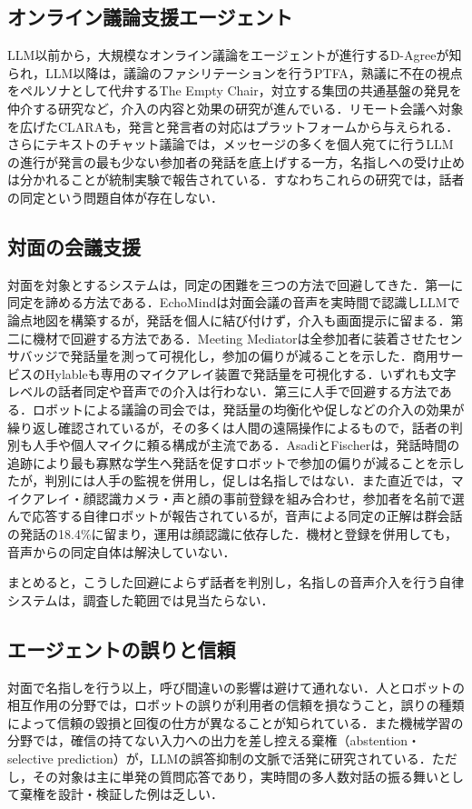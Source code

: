 \documentclass[a4paper]{ltjsarticle}
\begin{document}
\subsection{オンライン議論支援エージェント}
LLM以前から，大規模なオンライン議論をエージェントが進行するD-Agree\cite{ito}が知られ，LLM以降は，議論のファシリテーションを行うPTFA\cite{gu}，熟議に不在の視点をペルソナとして代弁するThe Empty Chair\cite{fulay}，対立する集団の共通基盤の発見を仲介する研究\cite{tessler}など，介入の内容と効果の研究が進んでいる．リモート会議へ対象を広げたCLARA\cite{gunasekaran}も，発言と発言者の対応はプラットフォームから与えられる．さらにテキストのチャット議論では，メッセージの多くを個人宛てに行うLLMの進行が発言の最も少ない参加者の発話を底上げする一方，名指しへの受け止めは分かれることが統制実験で報告されている\cite{alsobay}．すなわちこれらの研究では，話者の同定という問題自体が存在しない．

\subsection{対面の会議支援}
対面を対象とするシステムは，同定の困難を三つの方法で回避してきた．第一に同定を諦める方法である．EchoMind\cite{chen}は対面会議の音声を実時間で認識しLLMで論点地図を構築するが，発話を個人に結び付けず，介入も画面提示に留まる．第二に機材で回避する方法である．Meeting Mediator\cite{kim}は全参加者に装着させたセンサバッジで発話量を測って可視化し，参加の偏りが減ることを示した．商用サービスのHylableも専用のマイクアレイ装置で発話量を可視化する．いずれも文字レベルの話者同定や音声での介入は行わない．第三に人手で回避する方法である．ロボットによる議論の司会では，発話量の均衡化や促しなどの介入の効果が繰り返し確認されているが，その多くは人間の遠隔操作によるもので，話者の判別も人手や個人マイクに頼る構成が主流である\cite{weisswange}．AsadiとFischer\cite{asadi}は，発話時間の追跡により最も寡黙な学生へ発話を促すロボットで参加の偏りが減ることを示したが，判別には人手の監視を併用し，促しは名指しではない．また直近では，マイクアレイ・顔認識カメラ・声と顔の事前登録を組み合わせ，参加者を名前で選んで応答する自律ロボットが報告されているが，音声による同定の正解は群会話の発話の18.4\%に留まり，運用は顔認識に依存した\cite{abbo}．機材と登録を併用しても，音声からの同定自体は解決していない．

まとめると，こうした回避によらず話者を判別し，名指しの音声介入を行う自律システムは，調査した範囲では見当たらない．

\subsection{エージェントの誤りと信頼}
対面で名指しを行う以上，呼び間違いの影響は避けて通れない．人とロボットの相互作用の分野では，ロボットの誤りが利用者の信頼を損なうこと，誤りの種類によって信頼の毀損と回復の仕方が異なることが知られている\cite{salem}．また機械学習の分野では，確信の持てない入力への出力を差し控える棄権（abstention・selective prediction）が，LLMの誤答抑制の文脈で活発に研究されている\cite{wen}．ただし，その対象は主に単発の質問応答であり，実時間の多人数対話の振る舞いとして棄権を設計・検証した例は乏しい．
\end{document}
